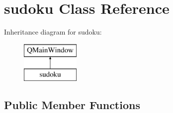 \hypertarget{classsudoku}{\section{sudoku Class Reference}
\label{classsudoku}
}
Inheritance diagram for sudoku\-:\begin{figure}[H]
\begin{center}
\leavevmode
\includegraphics[height=2.000000cm]{classsudoku}
\end{center}
\end{figure}
\subsection*{Public Member Functions}

